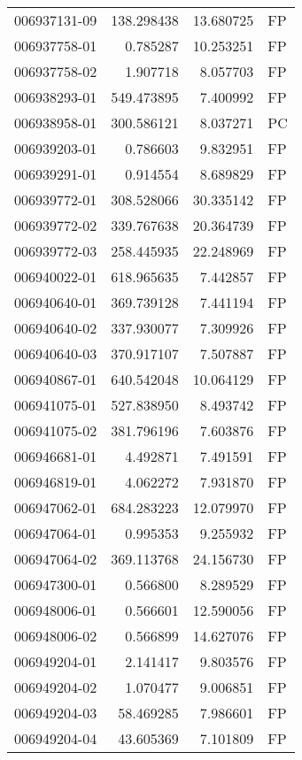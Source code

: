 \begin{tabular}{lrrl}
006937131-09 &  138.298438 &    13.680725 &   FP \\
006937758-01 &    0.785287 &    10.253251 &   FP \\
006937758-02 &    1.907718 &     8.057703 &   FP \\
006938293-01 &  549.473895 &     7.400992 &   FP \\
006938958-01 &  300.586121 &     8.037271 &   PC \\
006939203-01 &    0.786603 &     9.832951 &   FP \\
006939291-01 &    0.914554 &     8.689829 &   FP \\
006939772-01 &  308.528066 &    30.335142 &   FP \\
006939772-02 &  339.767638 &    20.364739 &   FP \\
006939772-03 &  258.445935 &    22.248969 &   FP \\
006940022-01 &  618.965635 &     7.442857 &   FP \\
006940640-01 &  369.739128 &     7.441194 &   FP \\
006940640-02 &  337.930077 &     7.309926 &   FP \\
006940640-03 &  370.917107 &     7.507887 &   FP \\
006940867-01 &  640.542048 &    10.064129 &   FP \\
006941075-01 &  527.838950 &     8.493742 &   FP \\
006941075-02 &  381.796196 &     7.603876 &   FP \\
006946681-01 &    4.492871 &     7.491591 &   FP \\
006946819-01 &    4.062272 &     7.931870 &   FP \\
006947062-01 &  684.283223 &    12.079970 &   FP \\
006947064-01 &    0.995353 &     9.255932 &   FP \\
006947064-02 &  369.113768 &    24.156730 &   FP \\
006947300-01 &    0.566800 &     8.289529 &   FP \\
006948006-01 &    0.566601 &    12.590056 &   FP \\
006948006-02 &    0.566899 &    14.627076 &   FP \\
006949204-01 &    2.141417 &     9.803576 &   FP \\
006949204-02 &    1.070477 &     9.006851 &   FP \\
006949204-03 &   58.469285 &     7.986601 &   FP \\
006949204-04 &   43.605369 &     7.101809 &   FP \\

\end{tabular}
